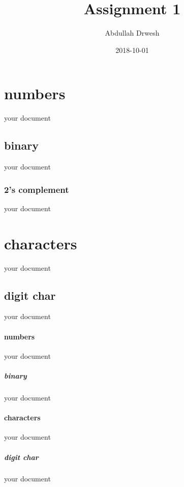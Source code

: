 \documentclass{article}
\title{Assignment 1}
\author{Abdullah Drwesh}
\date{2018-10-01}
\begin{document}
	\maketitle
	\newpage
	\section{numbers}
	your document
	\subsection{binary}
	your document
	\subsubsection{2's complement}
	your document
	\section{characters}
	your document
	\subsection{digit char}
	your document
	\newpage
	\paragraph{numbers}
	your document
	\subparagraph{binary}
	your document
	\paragraph{characters}
	your document
	\subparagraph{digit char}
	your document
		
\end{document}
